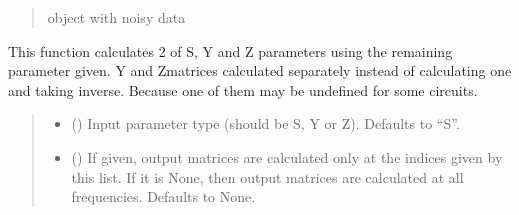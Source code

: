 \documentclass[letterpaper,10pt,english]{sphinxmanual}
\begin{document}
\begin{fulllineitems}
\begin{fulllineitems}
\begin{quote}
\begin{description}
\begin{itemize}
\end{itemize}

\sphinxAtStartPar
object with noisy data

\sphinxAtStartPar
{\hyperref[\detokenize{touchstone:touchstone.spfile}]{}}

\end{description}\end{quote}

\end{fulllineitems}


\begin{fulllineitems}
\label{\detokenize{touchstone:touchstone.spfile.calc_syz}}
\pysigstartsignatures
{}
\pysigstopsignatures
\sphinxAtStartPar
This function calculates 2 of S, Y and Z parameters using the remaining parameter given.
Y and Z\sphinxhyphen{}matrices calculated separately instead of calculating one and taking inverse. Because one of them may be undefined for some circuits.
\begin{quote}\begin{description}
\begin{itemize}
\item {}
\sphinxAtStartPar
{} (\sphinxstyleliteralemphasis{\sphinxupquote{, }}) \textendash{} Input parameter type (should be S, Y or Z). Defaults to “S”.

\item {}
\sphinxAtStartPar
{} (\sphinxstyleliteralemphasis{\sphinxupquote{, }}) \textendash{} If given, output matrices are calculated only at the indices given by this list. If it is None, then output matrices are calculated at all frequencies. Defaults to None.

\end{itemize}


\end{description}
\end{quote}
\end{fulllineitems}
\end{fulllineitems}
\end{document}
